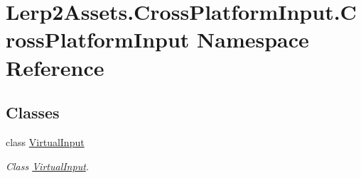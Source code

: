\hypertarget{namespace_lerp2_assets_1_1_cross_platform_input_1_1_cross_platform_input}{}\section{Lerp2\+Assets.\+Cross\+Platform\+Input.\+Cross\+Platform\+Input Namespace Reference}
\label{namespace_lerp2_assets_1_1_cross_platform_input_1_1_cross_platform_input}
\subsection*{Classes}
\begin{DoxyCompactItemize}
\item 
class \hyperlink{class_lerp2_assets_1_1_cross_platform_input_1_1_cross_platform_input_1_1_virtual_input}{Virtual\+Input}
\begin{DoxyCompactList}\small\item\em Class \hyperlink{class_lerp2_assets_1_1_cross_platform_input_1_1_cross_platform_input_1_1_virtual_input}{Virtual\+Input}. \end{DoxyCompactList}\end{DoxyCompactItemize}
